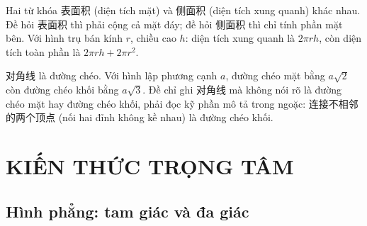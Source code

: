 \documentclass[11pt, a4paper]{article}
\begin{document}
 Hai từ khóa 表面积 (diện tích mặt) và 侧面积 (diện tích xung quanh) khác nhau. Đề hỏi 表面积 thì phải cộng cả mặt đáy; đề hỏi 侧面积 thì chỉ tính phần mặt bên. Với hình trụ bán kính $r$, chiều cao $h$: diện tích xung quanh là $2\pi r h$, còn diện tích toàn phần là $2\pi r h + 2\pi r^2$.

 对角线 là đường chéo. Với hình lập phương cạnh $a$, đường chéo mặt bằng $a\sqrt{2}$ còn đường chéo khối bằng $a\sqrt{3}$. Đề chỉ ghi 对角线 mà không nói rõ là đường chéo mặt hay đường chéo khối, phải đọc kỹ phần mô tả trong ngoặc: 连接不相邻的两个顶点 (nối hai đỉnh không kề nhau) là đường chéo khối.

\section{KIẾN THỨC TRỌNG TÂM}

\subsection{Hình phẳng: tam giác và đa giác}
\end{document}

